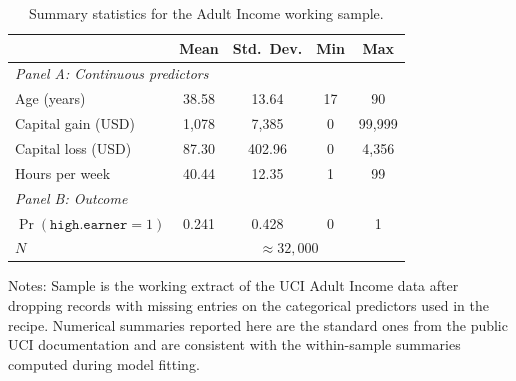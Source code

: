 \documentclass[12pt,english]{article}
\begin{document}
\begin{table}[ht]
\caption{Summary statistics for the Adult Income working sample.}
\label{tab:descriptives}
\centering
\begin{threeparttable}
\begin{tabular}{lcccc}
\toprule
                                         & Mean    & Std.\ Dev. & Min  & Max     \\
\midrule
\multicolumn{5}{l}{\emph{Panel A: Continuous predictors}}\\
\midrule
Age (years)                              & 38.58   & 13.64      & 17   & 90      \\
Capital gain (USD)                       & 1{,}078 & 7{,}385    & 0    & 99{,}999\\
Capital loss (USD)                       & 87.30   & 402.96     & 0    & 4{,}356 \\
Hours per week                           & 40.44   & 12.35      & 1    & 99      \\
\midrule
\multicolumn{5}{l}{\emph{Panel B: Outcome}}\\
\midrule
$\Pr(\texttt{high.earner}=1)$            & 0.241   & 0.428      & 0    & 1       \\
\midrule
$N$                                      & \multicolumn{4}{c}{$\approx 32{,}000$} \\
\bottomrule
\end{tabular}
\footnotesize Notes: Sample is the working extract of the UCI Adult Income
data after dropping records with missing entries on the categorical
predictors used in the recipe. Numerical summaries reported here are the
standard ones from the public UCI documentation and are consistent with
the within-sample summaries computed during model fitting.
\end{threeparttable}
\end{table}
\end{document}
